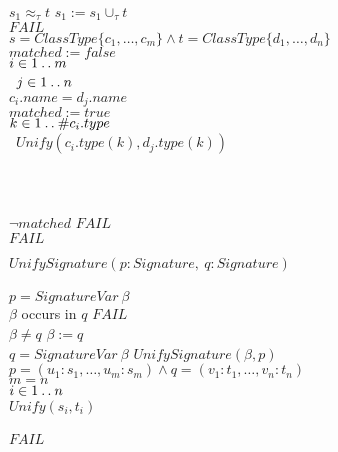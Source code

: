 \begin{figure}[!t]
\begin{tabbing}
\nexti\nexti\nexti\TIF $s_1 \approx_{\tau} t$ \TTHEN $s_1 := s_1 \cup_{\tau} t$\\
\nexti\nexti\nexti\TELSE $FAIL$\\
\nexti\nexti\TELSE\TIF $s = ClassType \{c_1, \ldots, c_m\} \land t =
   ClassType\{d_1, \ldots, d_n\}$ \TTHEN\\
\nexti\nexti{} $matched := false$\\
\nexti\nexti\nexti\TFOR $i \in 1 \mathbin{\mathstrut{\ldotp\ldotp}} m$ \TDO\\\
\nexti\nexti\nexti\nexti\TFOR $j \in 1 \mathbin{\mathstrut{\ldotp\ldotp}} n$ \TDO\\
\nexti\nexti\nexti\nexti\nexti\TIF $c_i.name = d_j.name$ \TTHEN\\
\nexti\nexti\nexti\nexti\nexti\nexti$matched := true$\\
\nexti\nexti\nexti\nexti\nexti\nexti\TFOR $k \in 1 \mathbin{\mathstrut{\ldotp\ldotp}} \#c_i.type$ \TDO\\\
\nexti\nexti\nexti\nexti\nexti\nexti\nexti $Unify(c_i.type(k), d_j.type(k))$\\
\nexti\nexti\nexti\nexti\nexti\nexti\TEND\\
\nexti\nexti\nexti\nexti\TEND\\
\nexti\nexti\nexti\TEND\\
\nexti\nexti\nexti\TIF $\lnot matched$ \TTHEN $FAIL$\\
\nexti\nexti\TELSE $FAIL$\\
\nexti\TEND
\end{tabbing}
\label{weakUnify}
\end{figure}
\begin{figure}
\begin{tabbing}
$UnifySignature(p : Signature,~ q : Signature)$\\
\nexti\TBEGIN\\
\nexti\nexti\TIF $p = SignatureVar~\beta$ \TTHEN\\
\nexti\nexti\nexti\TIF $\beta$ occurs in $q$ \TTHEN $FAIL$\\
\nexti\nexti\nexti\TELSE\TIF $\beta \neq q$ \TTHEN $\beta := q$\\
\nexti\nexti\TELSE\TIF $q = SignatureVar~\beta$ \TTHEN $UnifySignature(\beta, p)$\\
\nexti\nexti\TELSE\TIF $p = (u_1 : s_1, \ldots, u_m : s_m) \land q =
(v_1 : t_1, \ldots, v_n : t_n)$ \TTHEN\\
\nexti\nexti\nexti\TIF $m = n$ \TTHEN\\
\nexti\nexti\nexti\nexti\TFOR $i \in 1 \mathbin{\mathstrut{\ldotp\ldotp}} n$ \TDO\\
\nexti\nexti\nexti\nexti\nexti $Unify(s_i, t_i)$\\
\nexti\nexti\nexti\nexti\TEND\\
\nexti\nexti\nexti\TELSE $FAIL$\\
\nexti\TEND
\end{tabbing}
\end{figure}

